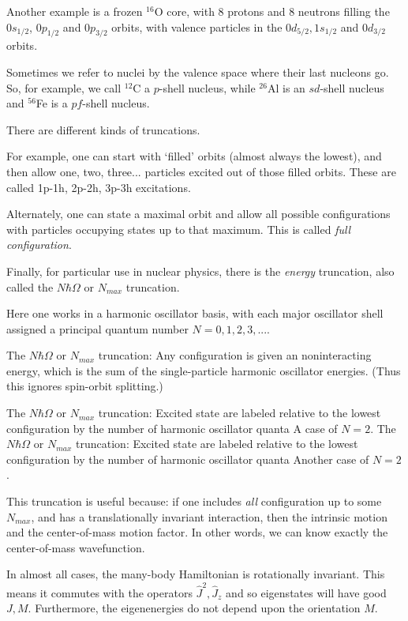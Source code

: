 Another example is a frozen $^{16}$O core, with 8 protons and 8 neutrons filling the 
$0s_{1/2}$,  $0p_{1/2}$ and $0p_{3/2}$ orbits, with valence particles in the 
$0d_{5/2}, 1s_{1/2}$ and $0d_{3/2}$ orbits.

Sometimes we refer to nuclei by the valence space where their last nucleons go.  
So, for example, we call $^{12}$C a $p$-shell nucleus, while $^{26}$Al is an 
$sd$-shell nucleus and $^{56}$Fe is a $pf$-shell nucleus.

There are different kinds of truncations.


For example, one can start with `filled' orbits (almost always the lowest), and then 
allow one, two, three... particles excited out of those filled orbits. These are called 
1p-1h, 2p-2h, 3p-3h excitations. 

Alternately, one can state a maximal orbit and allow all possible configurations with 
particles occupying states up to that maximum. This is called \textit{full configuration}.

Finally, for particular use in nuclear physics, there is the \textit{energy} truncation, also 
called the $N\hbar\Omega$ or $N_{max}$ truncation. 


 Here one works in a harmonic oscillator basis, with each major oscillator shell assigned 
a principal quantum number $N=0,1,2,3,...$. 

The $N\hbar\Omega$ or $N_{max}$ truncation:
Any configuration is given an noninteracting energy, which is the sum 
of the single-particle harmonic oscillator energies. (Thus this ignores 
spin-orbit splitting.)

The $N\hbar\Omega$ or $N_{max}$ truncation:
Excited state are labeled relative to the lowest configuration by the 
number of harmonic oscillator quanta
A case of $N=2$.
The $N\hbar\Omega$ or $N_{max}$ truncation:
Excited state are labeled relative to the lowest configuration by the 
number of harmonic oscillator quanta
Another case of $N=2$.

This truncation is useful because: if one includes \textit{all} configuration up to 
some $N_{max}$, and has a translationally invariant interaction, then the intrinsic 
motion and the center-of-mass motion factor. In other words, we can know exactly 
the center-of-mass wavefunction. 

In almost all cases, the many-body Hamiltonian is rotationally invariant. This means 
it commutes with the operators $\hat{J}^2, \hat{J}_z$ and so eigenstates will have 
good $J,M$. Furthermore, the eigenenergies do not depend upon the orientation $M$. 

